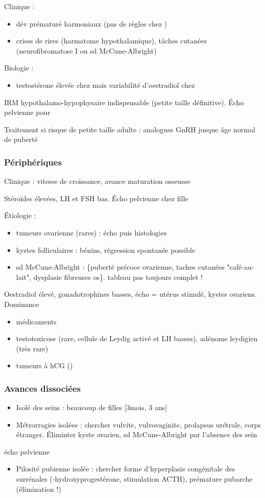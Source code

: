 \documentclass[11pt]{article}
\begin{document}
Clinique : 
\begin{itemize}
\item dév prématuré harmoniaux (pas de règles chez \female)
\item crises de rires (harmatome hypothalamique), tâches cutanées (neurofibromatose
I ou sd McCune-Albright)
\end{itemize}
Biologie :
\begin{itemize}
\item testostérone élevée chez \male mais variabilité d'oestradiol chez \female
\end{itemize}

IRM hypothalamo-hypophysaire indispensable \danger (petite taille
définitive). Écho pelvienne pour \female

Traitement si risque de petite taille adulte : analogues GnRH jusque âge normal
de puberté
\subsubsection{Périphériques}
\label{sec:org43489e9}
Clinique : \inc vitesse de croissance, avance maturation osseusse

Stéroïdes élevées, LH et FSH bas. Écho pelvienne chez fille

Étiologie :
\begin{itemize}
\item tumeurs ovarienne (rares) : écho puis histologies
\item kystes folliculaires : bénins, régression spontanée possible
\item sd McCune-Albright : \{puberté précoce ovarienne, taches cutanées
"café-au-lait", dysplasie fibreuses os\}. \danger tableau pas toujours complet
!\\
\end{itemize}
Oestradiol élevé, gonadotrophines basses, écho = utérus stimulé, kystes
ovariens. Dominance \female
\begin{itemize}
\item médicaments
\item testotoxicose (rare, cellule de Leydig activé et LH basses), adénome leydigien
(très rare)
\item tumeurs à hCG (\male)
\end{itemize}
\subsubsection{Avances dissociées}
\label{sec:org17e5980}
\begin{itemize}
\item Isolé des seins : beaucoup de filles [3mois, 3 ans]
\item Métrorragies isolées : chercher vulvite, vulvovaginite, prolapsus urétrale,
corps étranger. Éliminter kyste ovarien, sd McCune-Albright par l'absence des
sein
\end{itemize}
\thus écho pelvienne
\begin{itemize}
\item Pilosité pubienne isolée : chercher forme d'hyperplasie congénitale des
surrénales (-hydroxyprogestérone, stimulation ACTH), prémature pubarche
(élimination !)
\end{itemize}
\end{document}
